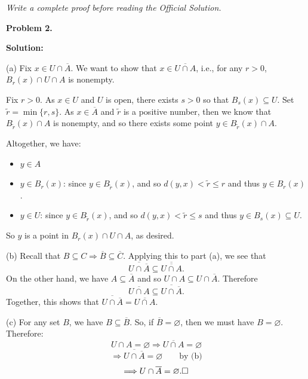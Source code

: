 \documentclass[12pt]{article}
\newcommand{\writespace}[1]{\vspace{#1}}
\begin{document}
\newpage

\begin{tcolorbox}[
  enhanced, breakable,
  colback  = pass5gray,
  colframe = black!38,
  fonttitle = \bfseries,
  title = {Pass 5 \enspace\textbf{--}\enspace Full Proof Attempt}
]
\small\itshape Write a complete proof before reading the Official Solution.\par
\normalfont\normalsize
\writespace{19cm}
\end{tcolorbox}

\newpage

\begin{tcolorbox}[
  enhanced, breakable,
  colback  = solgreen,
  colframe = green!45!black,
  fonttitle = \bfseries,
  title = {\textsc{Official Solution}\hfill Homework 9 -- Solutions}
]
\textbf{Problem 2.}

\medskip\textbf{Solution:}

\medskip
(a) Fix $x \in U \cap \overline{A}$. We want to show that $x \in \overline{U \cap A}$, i.e., for any $r > 0$,
$B_r(x) \cap U \cap A$ is nonempty.

\medskip
Fix $r > 0$. As $x \in U$ and $U$ is open, there exists $s > 0$ so that $B_s(x) \subseteq U$. Set
$\tilde r = \min\{r, s\}$. As $x \in \overline{A}$ and $\tilde r$ is a positive number, then we know that
$B_{\tilde r}(x) \cap A$ is nonempty, and so there exists some point $y \in B_{\tilde r}(x) \cap A$.

\medskip
Altogether, we have:
\begin{itemize}[nosep, leftmargin=1.5em]
  \item $y \in A$
  \item $y \in B_r(x)$: since $y \in B_{\tilde r}(x)$, and so $d(y, x) < \tilde r \le r$ and thus $y \in B_r(x)$.
  \item $y \in U$: since $y \in B_{\tilde r}(x)$, and so $d(y, x) < \tilde r \le s$ and thus $y \in B_s(x) \subseteq U$.
\end{itemize}
So $y$ is a point in $B_r(x) \cap U \cap A$, as desired.

\medskip
(b) Recall that $B \subseteq C \Longrightarrow \overline{B} \subseteq \overline{C}$. Applying this to part (a), we see that
\[
  \overline{U \cap \overline{A}} \subseteq \overline{\overline{U \cap A}}.
\]
On the other hand, we have $A \subseteq \overline{A}$ and so $U \cap A \subseteq U \cap \overline{A}$. Therefore
\[
  \overline{U \cap A} \subseteq \overline{U \cap \overline{A}}.
\]
Together, this shows that $\overline{U \cap \overline{A}} = \overline{U \cap A}$.

\medskip
(c) For any set $B$, we have $B \subseteq \overline{B}$. So, if $\overline{B} = \varnothing$, then we must have
$B = \varnothing$. Therefore:
\[
  U \cap A = \varnothing \Longrightarrow \overline{U \cap A} = \varnothing
\]
\[
  \Longrightarrow \overline{U \cap \overline{A}} = \varnothing \qquad \text{by (b)}
\]
\[
  \Longrightarrow U \cap \overline{A} = \varnothing.\hfill\square
\]
\end{tcolorbox}
\end{document}
